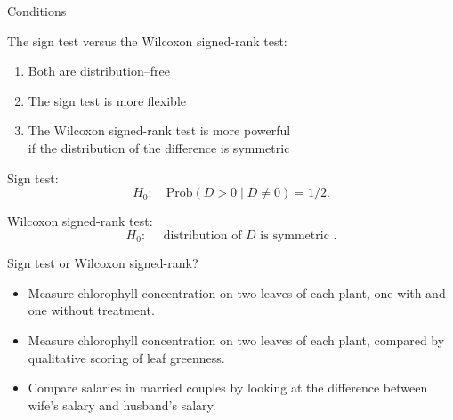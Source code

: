 \begin{frame}{Conditions}

  The sign test versus the Wilcoxon signed-rank test:
  \begin{enumerate}
    \item Both are distribution--free
    \item The sign test is \alert{more flexible} 
    \item The Wilcoxon signed-rank test is \alert{more powerful} \\
        if the distribution of the difference is symmetric
  \end{enumerate}

    \vspace{2em}

    Sign test:
    \[ H_0: \quad \mbox{Prob}(D>0\;|\;D\neq 0) = 1/2 . \]

    \vspace{2em}

    Wilcoxon signed-rank test:
    \[ H_0: \quad \text{ distribution of $D$ is symmetric } .\]

\end{frame}

\begin{frame}{Sign test or Wilcoxon signed-rank?}


  \begin{itemize}

      \item Measure chlorophyll concentration
        on two leaves of each plant, one with and one without treatment.
      \pause

      \pause
      \vspace{1em}

      \item Measure chlorophyll concentration
            on two leaves of each plant, compared by qualitative scoring of leaf greenness.
      \pause

      \pause
      \vspace{1em}

      \item Compare salaries in married couples by looking 
          at the difference between wife's salary and husband's salary.
          \pause


  \end{itemize}

\end{frame}

